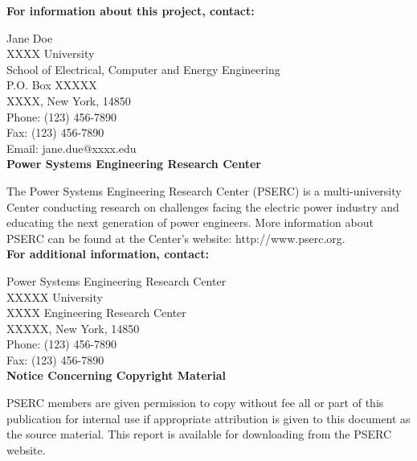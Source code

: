 \documentclass[letterpaper, 12pt, oneside]{book}
\theoremstyle{plain}
\theoremstyle{definition}
\theoremstyle{remark}
\begin{document}
\newpage
\noindent \textbf{For information about this project, contact:}
\vspace{10pt}

\noindent Jane Doe\\
XXXX University\\
School of Electrical, Computer and Energy Engineering\\
P.O. Box XXXXX\\
XXXX, New York, 14850\\
Phone: (123) 456-7890\\
Fax: (123) 456-7890  \\
Email: jane.due@xxxx.edu \\

\noindent \textbf{Power Systems Engineering Research Center}
\vspace{10pt}

\noindent The Power Systems Engineering Research Center (PSERC) is a multi-university Center conducting research on challenges facing the electric power industry and educating the next generation of power engineers. More information about PSERC can be found at the Center’s website: http://www.pserc.org. \\


\noindent \textbf{For additional information, contact:}
\vspace{10pt}

\noindent Power Systems Engineering Research Center\\
XXXXX University\\
XXXX Engineering Research Center\\
XXXXX, New York, 14850\\
Phone: (123) 456-7890\\
Fax: (123) 456-7890 \\


\noindent \textbf{Notice Concerning Copyright Material}
\vspace{10pt}

\noindent PSERC members are given permission to copy without fee all or part of this publication for internal use if appropriate attribution is given to this document as the source material. This report is available for downloading from the PSERC website.\\
\end{document}
